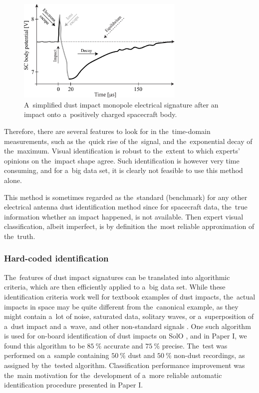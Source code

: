 \begin{figure}[ht]
 	\centering
 	\includegraphics[width=8cm]{figures/impact_wf_gs.pdf}
 	\caption{A~simplified dust impact monopole electrical signature after an impact onto a~positively charged spacecraft body.}
 	\label{fig:impact_process}
\end{figure}

Therefore, there are several features to look for in the~time-domain measurements, such as the~quick rise of the~signal, and the~exponential decay of the~maximum. Visual identification is robust to the~extent to which experts' opinions on the~impact shape agree. Such identification is however very time consuming, and for a~big data set, it is clearly not feasible to use this method alone. 

This method is sometimes regarded as the~standard (benchmark) for any other electrical antenna dust identification method since for spacecraft data, the~true information whether an impact happened, is not available. Then expert visual classification, albeit imperfect, is by definition the~most reliable approximation of the~truth.

\subsubsection{Hard-coded identification}

The~features of dust impact signatures can be translated into algorithmic criteria, which are then efficiently applied to a~big data set. While these identification criteria work well for textbook examples of dust impacts, the~actual impacts in space may be quite different from the~canonical example, as they might contain a~lot of noise, saturated data, solitary waves, or a~superposition of a~dust impact and a~wave, and other non-standard signals \citep{vaverka2018comparison,ye2019understanding,malaspina2023dust}. One such algorithm is used for on-board identification of dust impacts on SolO \citep{maksimovic2020solar}, and in Paper I, we found this algorithm to be $\SI{85}{\%}$ accurate and $\SI{75}{\%}$ precise. The~test was performed on a~sample containing $\SI{50}{\%}$ dust and $\SI{50}{\%}$ non-dust recordings, as assigned by the~tested algorithm. Classification performance improvement was the~main motivation for the~development of a~more reliable automatic identification procedure presented in Paper I. 


